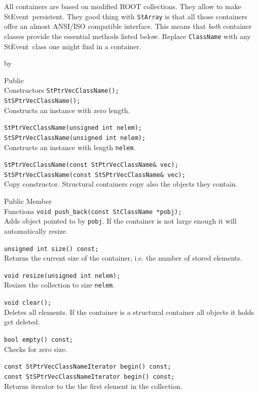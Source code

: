 \documentclass[twoside]{article}
\newcommand{\StEvent}{\textsf{StEvent}}
\newcommand{\entrylabel}[1]{\mbox{\textbf{{#1}}}\hfil}%
\newenvironment{entry}
{\begin{list}{}%
    {\renewcommand{\makelabel}{\entrylabel}%
     \setlength{\labelwidth}{90pt}%
     \setlength{\leftmargin}{\labelwidth}
     \advance\leftmargin by \labelsep%
      }%
    }%
  {\end{list}}
\newcommand{\Entrylabel}[1]%
{\raisebox{0pt}[1ex][0pt]{\makebox[\labelwidth][l]%
    {\parbox[t]{\labelwidth}{\hspace{0pt}\textbf{{#1}}}}}}
\newenvironment{Entry}%
{\renewcommand{\entrylabel}{\Entrylabel}\begin{entry}}%
  {\end{entry}}
\begin{document}
All containers are based on modified ROOT  collections.
They allow to make \StEvent\ persistent. They good thing with
\texttt{StArray} is that all those containers offer an almost ANSI/ISO
compatible interface.  This means that \emph{both} container classes
provide the essential methods listed below. Replace \texttt{ClassName}
with any \StEvent\ class one might find in a container.
\begin{Entry}
\item[Public\\ Constructors]
    \verb+StPtrVecClassName();+\\
    \verb+StSPtrVecClassName();+\\
    Constructs an instance with zero length.

    \verb+StPtrVecClassName(unsigned int nelem);+\\
    \verb+StSPtrVecClassName(unsigned int nelem);+\\
    Constructs an instance with length \texttt{nelem}.
    
    \verb+StPtrVecClassName(const StPtrVecClassName& vec);+\\
    \verb+StSPtrVecClassName(const StSPtrVecClassName& vec);+\\
    Copy constructor. Structural containers copy also the objects they
    contain.
    
\item[Public Member\\ Functions]
    \verb+void push_back(const StClassName *pobj);+\\
    Adds object pointed to by \texttt{pobj}. If the container is not
    large enough it will automatically resize.

    \verb+unsigned int size() const;+\\
    Returns the current size of the container, i.e. the number of
    stored elements.
    
    \verb+void resize(unsigned int nelem);+\\
    Resizes the collection to size \texttt{nelem}.

    \verb+void clear();+\\
    Deletes all elements. If the container is a structural container
    all objects it holds get deleted.
    
    \verb+bool empty() const;+\\
    Checks for zero size.
    
    \verb+const StPtrVecClassNameIterator begin() const;+\\
    \verb+const StSPtrVecClassNameIterator begin() const;+\\
    Returns iterator to the the first element in the collection.
    

\end{Entry}
\end{document}
